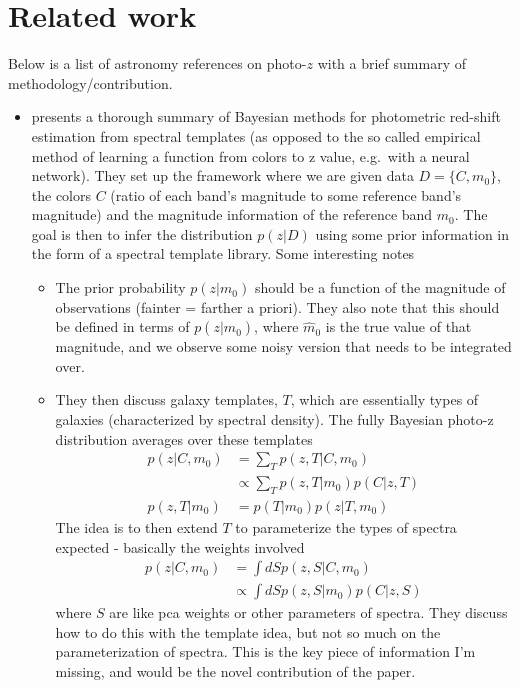 \documentclass[11pt]{article}
\begin{document}
\section{Related work}
Below is a list of astronomy references on photo-$z$ with a brief summary of methodology/contribution.  

\begin{itemize}

\item \cite{benitez2000bayesian} presents a thorough summary of Bayesian methods for photometric red-shift estimation from spectral templates (as opposed to the so called empirical method of learning a function from colors to z value, e.g.~with a neural network).  They set up the framework where we are given data $D =\{C, m_0\}$, the colors $C$ (ratio of each band's magnitude to some reference band's magnitude) and the magnitude information of the reference band $m_0$.  The goal is then to infer the distribution $p(z | D)$ using some prior information in the form of a spectral template library.  Some interesting notes
  \begin{itemize}
  \item The prior probability $p(z | m_0)$ should be a function of the magnitude of observations (fainter = farther a priori).  They also note that this should be defined in terms of $p(z | \hat m_0)$, where $\hat m_0$ is the true value of that magnitude, and we observe some noisy version that needs to be integrated over.  
  \item They then discuss galaxy templates, $T$, which are essentially types of galaxies (characterized by spectral density).  The fully Bayesian photo-z distribution averages over these templates
  \begin{align}
  p(z | C, m_0) 
    &= \sum_T p(z, T | C, m_0) \\
    &\propto \sum_T p(z, T |m_0) p(C | z, T) \\
    p(z, T | m_0) &= p(T | m_0) p(z | T, m_0)
  \end{align}
  The idea is to then extend $T$ to parameterize the types of spectra expected - basically the weights involved
  \begin{align}
    p(z | C, m_0) &= \int dS p(z, S | C, m_0) \\
     &\propto \int dS p(z, S | m_0) p(C | z, S)
  \end{align}
  where $S$ are like pca weights or other parameters of spectra.  
  They discuss how to do this with the template idea, but not so much on the parameterization of spectra.  This is the key piece of information I'm missing, and would be the novel contribution of the paper.  

\end{itemize}
\end{itemize}
\end{document}
